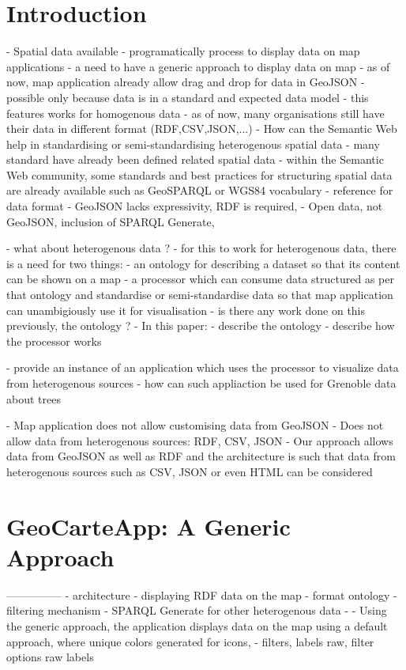 \documentclass[a4paper,pagenum,english]{rnti}
\affiliation{
    \affil{1}Univ Lyon, MINES Saint-\'Etienne, CNRS, Laboratoire Hubert Curien UMR 5516, \\F-42023 Saint-\'Etienne, France\\
          \{prenom.nom\}@emse.fr\\
    \affil{2}Mondeca, \\ 35 boulevard Strasbourg, Paris, France\\
          ghislain.atemezing@mondeca.com\\
 }
\begin{document}
%
\section{Introduction}
- Spatial data available
- programatically process to display data on map applications
- a need to have a generic approach to display data on map
- as of now, map application already allow drag and drop for data in GeoJSON
- possible only because data is in a standard and expected data model
- this features works for homogenous data
- as of now, many organisations still have their data in different format (RDF,CSV,JSON,...)
- How can the Semantic Web help in standardising or semi-standardising heterogenous spatial data
	- many standard have already been defined related spatial data
		- within the Semantic Web community, some standards and best practices for structuring spatial data are already available such as GeoSPARQL or WGS84 vocabulary 
- reference for data format %
- GeoJSON lacks expressivity, RDF is required,
- Open data, not GeoJSON, inclusion of SPARQL Generate,

- what about heterogenous data ?
- for this to work for heterogenous data, there is a need for two things:
	- an ontology for describing a dataset so that its content can be shown on a map
	- a processor which can consume data structured as per that ontology and standardise or semi-standardise 
	data so that map application can unambigiously use it for visualisation
- is there any work done on this previously, the ontology ?
- In this paper:
	- describe the ontology 
	- describe how the processor works
	
	- provide an instance of an application which uses the processor to visualize data from heterogenous sources
	- how can such appliaction be used for Grenoble data about trees

- Map application does not allow customising data from GeoJSON
- Does not allow data from heterogenous sources: RDF, CSV, JSON
- Our approach allows data from GeoJSON as well as RDF and the architecture is such that data from heterogenous sources such as CSV, JSON or even HTML can be considered
\section{ GeoCarteApp: A Generic Approach}
---------------
- architecture
- displaying RDF data on the map
- format ontology
- filtering mechanism
- SPARQL Generate for other heterogenous data
- - Using the generic approach, the application displays data on the map using a default approach, where unique colors generated for icons,
- filters, labels raw, filter options raw labels
\end{document}
